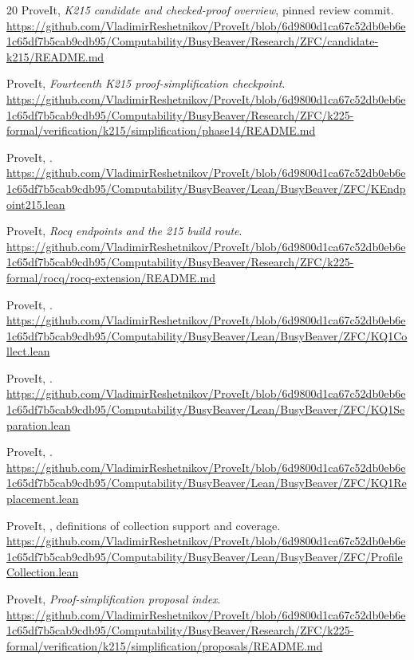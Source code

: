 \documentclass[11pt,letterpaper]{article}
\begin{document}
\begin{thebibliography}{20}
\footnotesize
\setlength{\itemsep}{2pt}
\setlength{\parskip}{0pt}
ProveIt, \emph{K215 candidate and checked-proof overview}, pinned review commit.
\url{https://github.com/VladimirReshetnikov/ProveIt/blob/6d9800d1ca67c52db0eb6e1c65df7b5cab9cdb95/Computability/BusyBeaver/Research/ZFC/candidate-k215/README.md}

ProveIt, \emph{Fourteenth K215 proof-simplification checkpoint}.
\url{https://github.com/VladimirReshetnikov/ProveIt/blob/6d9800d1ca67c52db0eb6e1c65df7b5cab9cdb95/Computability/BusyBeaver/Research/ZFC/k225-formal/verification/k215/simplification/phase14/README.md}

ProveIt, .
\url{https://github.com/VladimirReshetnikov/ProveIt/blob/6d9800d1ca67c52db0eb6e1c65df7b5cab9cdb95/Computability/BusyBeaver/Lean/BusyBeaver/ZFC/KEndpoint215.lean}

ProveIt, \emph{Rocq endpoints and the 215 build route}.
\url{https://github.com/VladimirReshetnikov/ProveIt/blob/6d9800d1ca67c52db0eb6e1c65df7b5cab9cdb95/Computability/BusyBeaver/Research/ZFC/k225-formal/rocq/rocq-extension/README.md}

ProveIt, .
\url{https://github.com/VladimirReshetnikov/ProveIt/blob/6d9800d1ca67c52db0eb6e1c65df7b5cab9cdb95/Computability/BusyBeaver/Lean/BusyBeaver/ZFC/KQ1Collect.lean}

ProveIt, .
\url{https://github.com/VladimirReshetnikov/ProveIt/blob/6d9800d1ca67c52db0eb6e1c65df7b5cab9cdb95/Computability/BusyBeaver/Lean/BusyBeaver/ZFC/KQ1Separation.lean}

ProveIt, .
\url{https://github.com/VladimirReshetnikov/ProveIt/blob/6d9800d1ca67c52db0eb6e1c65df7b5cab9cdb95/Computability/BusyBeaver/Lean/BusyBeaver/ZFC/KQ1Replacement.lean}

ProveIt, , definitions of collection support and coverage.
\url{https://github.com/VladimirReshetnikov/ProveIt/blob/6d9800d1ca67c52db0eb6e1c65df7b5cab9cdb95/Computability/BusyBeaver/Lean/BusyBeaver/ZFC/ProfileCollection.lean}

ProveIt, \emph{Proof-simplification proposal index}.
\url{https://github.com/VladimirReshetnikov/ProveIt/blob/6d9800d1ca67c52db0eb6e1c65df7b5cab9cdb95/Computability/BusyBeaver/Research/ZFC/k225-formal/verification/k215/simplification/proposals/README.md}


\end{thebibliography}
\end{document}
